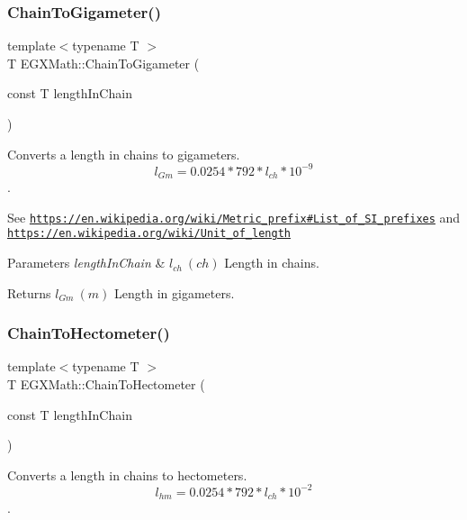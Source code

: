 \subsubsection{\texorpdfstring{Chain\+To\+Gigameter()}{ChainToGigameter()}}
{\footnotesize\ttfamily template$<$typename T $>$ \\
T E\+G\+X\+Math\+::\+Chain\+To\+Gigameter (\begin{DoxyParamCaption}\item[{const T}]{length\+In\+Chain }\end{DoxyParamCaption})}



Converts a length in chains to gigameters. \[ l_{Gm}=0.0254 * 792 * l_{ch} * 10^{-9} \]. 

See \href{https://en.wikipedia.org/wiki/Metric_prefix#List_of_SI_prefixes}{\tt https\+://en.\+wikipedia.\+org/wiki/\+Metric\+\_\+prefix\#\+List\+\_\+of\+\_\+\+S\+I\+\_\+prefixes} and \href{https://en.wikipedia.org/wiki/Unit_of_length}{\tt https\+://en.\+wikipedia.\+org/wiki/\+Unit\+\_\+of\+\_\+length} 
\begin{DoxyParams}{Parameters}
{\em length\+In\+Chain} & $ l_{ch}\ (ch)$ Length in chains. \\
\hline
\end{DoxyParams}
\begin{DoxyReturn}{Returns}
$ l_{Gm}\ (m)$ Length in gigameters. 
\end{DoxyReturn}
\mbox{\label{group___e_g_x_math-_conversions-_length_conversions-_imperial-_chain-_s_i_ga306a29ba8425ed22c19171e718d42f20}} 
\subsubsection{\texorpdfstring{Chain\+To\+Hectometer()}{ChainToHectometer()}}
{\footnotesize\ttfamily template$<$typename T $>$ \\
T E\+G\+X\+Math\+::\+Chain\+To\+Hectometer (\begin{DoxyParamCaption}\item[{const T}]{length\+In\+Chain }\end{DoxyParamCaption})}



Converts a length in chains to hectometers. \[ l_{hm}=0.0254 * 792 * l_{ch} * 10^{-2} \]. 

